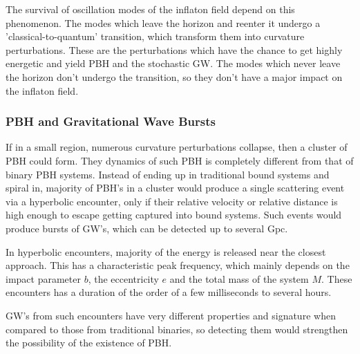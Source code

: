 The survival of oscillation modes of the inflaton field depend on this phenomenon. The modes which leave the horizon and reenter it undergo a 'classical-to-quantum' transition, which transform them into curvature perturbations. These are the perturbations which have the chance to get highly energetic and yield PBH and the stochastic GW. The modes which never leave the horizon don't undergo the transition, so they don't have a major impact on the inflaton field.

\subsubsection{PBH and Gravitational Wave Bursts}
If in a small region, numerous curvature perturbations collapse, then a cluster of PBH could form. They dynamics of such PBH is completely different from that of binary PBH systems. Instead of ending up in traditional bound systems and spiral in, majority of PBH's in a cluster would produce a single scattering event via a hyperbolic encounter, only if their relative velocity or relative distance is high enough to escape getting captured into bound systems. Such events would produce bursts of GW's, which can be detected up to several Gpc. 

In hyperbolic encounters, majority of the energy is released near the closest approach. This has a characteristic peak frequency, which mainly depends on the impact parameter $b$, the eccentricity $e$ and the total mass of the system $M$. These encounters has a duration of the order of a few milliseconds to several hours.

GW's from such encounters have very different properties and signature when compared to those from traditional binaries, so detecting them would strengthen the possibility of the existence of PBH. 














































































\pagebreak